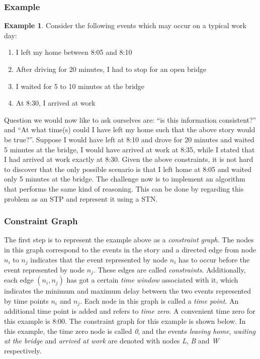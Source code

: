 \documentclass{article}
\theoremstyle{definition}
\newtheorem{example}{Example}[section]
\begin{document}
\subsubsection{Example}
\begin{example}
\label{exmp:stn}
Consider the following events which may occur on a typical work day:
\begin{enumerate}
\item I left my home between 8:05 and 8:10
\item After driving for 20 minutes, I had to stop for an open bridge
\item I waited for 5 to 10 minutes at the bridge
\item At 8:30, I arrived at work 
\end{enumerate}
\end{example}

Question we would now like to ask ourselves are: ``is this information consistent?'' and ``At what time(s) could I have left my home such that the above story would be true?''. 
Suppose I would have left at 8:10 and drove for 20 minutes and waited 5 minutes at the bridge, I would have arrived at work at 8:35, while I stated that I had arrived at work exactly at 8:30. 
Given the above constraints, it is not hard to discover that the only possible scenario is that I left home at 8:05 and waited only 5 minutes at the bridge.
The challenge now is to implement an algorithm that performs the same kind of reasoning. This can be done by regarding this problem as an STP and represent it using a STN.

\subsubsection{Constraint Graph}
The first step is to represent the example above as a \emph{constraint graph}. 
The nodes in this graph correspond to the events in the story and a directed edge from node $n_i$ to $n_j$ indicates that the event represented by node $n_i$ has to occur before the event represented by node $n_j$.
These edges are called \emph{constraints}. Additionally, each edge $(n_i, n_j)$ has got a certain \emph{time window} associated with it, which indicates the minimum and maximum delay between the two events represented by time points $n_i$ and $n_j$. 
Each node in this graph is called a \emph{time point}. 
An additional time point is added and refers to \emph{time zero}. 
A convenient time zero for this example is 8:00. 
The constraint graph for this example is shown below. 
In this example, the time zero node is called \emph{0}, and the events \emph{leaving home},  \emph{waiting at the bridge} and \emph{arrived at work} are denoted with nodes \emph{L}, \emph{B} and \emph{W} respectively.
\end{document}
